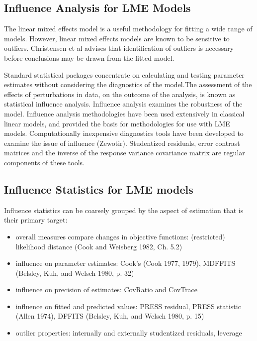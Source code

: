 \documentclass[12pt, a4paper]{article}
\begin{document}
	
	
	
	
	\subsection*{Influence Analysis for LME Models} %
	The linear mixed effects model is a useful methodology for fitting a wide range of models. However, linear mixed effects models are known to be sensitive to outliers. Christensen et al advises that identification of outliers is necessary before conclusions may be drawn from the fitted model.
	
	Standard statistical packages concentrate on calculating and testing parameter estimates without considering the diagnostics of the model.The assessment of the effects of perturbations in data, on the outcome of the analysis, is known as statistical influence analysis. Influence analysis examines the robustness of the model. Influence analysis methodologies have been used extensively in classical linear models, and provided the basis for methodologies for use with LME models.
	Computationally inexpensive diagnostics tools have been developed to examine the issue of influence (Zewotir).
	Studentized residuals, error contrast matrices and the inverse of the response variance covariance matrix are regular components of these tools.
	
	\subsection*{Influence Statistics for LME models} %
	Influence statistics can be coarsely grouped by the aspect of estimation that is their primary target:
	\begin{itemize}
		\item overall measures compare changes in objective functions: (restricted) likelihood distance (Cook and Weisberg 1982, Ch. 5.2)
		\item influence on parameter estimates: Cook's  (Cook 1977, 1979), MDFFITS (Belsley, Kuh, and Welsch 1980, p. 32)
		\item influence on precision of estimates: CovRatio and CovTrace
		\item influence on fitted and predicted values: PRESS residual, PRESS statistic (Allen 1974), DFFITS (Belsley, Kuh, and Welsch 1980, p. 15)
		\item outlier properties: internally and externally studentized residuals, leverage
	\end{itemize}
	
\end{document}

